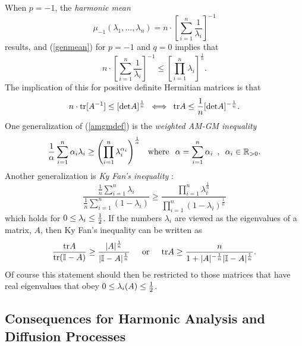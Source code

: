 \documentclass{svmult}
\def\half{ {1\over 2} }
\def\htab{ {\hskip 0.1 true in} }
\newcommand{\beq}{ \begin{equation}}
\newcommand{\eeq}{ \end{equation} }
\newcommand{\IR}{\mathbb{R}}
\newcommand{\II}{\mathbb{I}}
\newcommand{\wskip}{\htab {\rm where} \htab}
\begin{document}
When $p=-1$, the {\it harmonic mean}
$$ \mu_{-1}(\lambda_1,...,\lambda_n) = n \cdot \left[\sum_{i=1}^{n} \frac{1}{\lambda_i} \right]^{-1} $$
results, and (\ref{genmean}) for $p=-1$ and $q=0$ implies that
$$  n \cdot \left[\sum_{i=1}^{n} \frac{1}{\lambda_i} \right]^{-1} \leq \left[\prod_{i=1}^{n} {\lambda_i} \right]^{\frac{1}{n}}. $$
The implication of this for positive definite Hermitian matrices is that
\beq
n \cdot {\rm tr} [A^{-1}] \leq [{\rm det} A]^{\frac{1}{n}} \,\,\, \Longleftrightarrow \,\,\, {\rm tr} A \leq \frac{1}{n} [{\rm det} A]^{-\frac{1}{n}}.
\label{dkkk332d}
\eeq
One generalization of (\ref{amgmdef}) is the {\it weighted AM-GM inequality}
\beq
\frac{1}{\alpha} \sum_{i=1}^{n} \alpha_i \lambda_i \geq \left(\prod_{i=1}^{n} \lambda_i^{\alpha_i}
\right)^{\frac{1}{\alpha}} \wskip \alpha = \sum_{i=1}^{n} \alpha_i \,\,\, , \,\,\, \alpha_i \in \IR_{>0}.
\label{weightedamgmdef}
\eeq
Another generalization is {\it Ky Fan's inequality} \cite{Neuman}:
\beq
\frac{\frac{1}{n} \sum_{i=1}^{n} \lambda_i}{\frac{1}{n} \sum_{i=1}^{n} (1-\lambda_i)}
 \geq \frac{\prod_{i=1}^{n} \lambda_i^{\frac{1}{n}}}{\prod_{i=1}^{n} (1-\lambda_i)^{\frac{1}{n}}}
\label{kyfanlambda}
\eeq
which holds for $0 \leq \lambda_i \leq \half$.
If the numbers $\lambda_i$ are viewed as the eigenvalues of a matrix, $A$,
then Ky Fan's inequality can be written as
\beq
\frac{{\rm tr} A}{{\rm tr} (\II - A)}
\geq \frac{|A|^{\frac{1}{n}}}{|\II - A|^{\frac{1}{n}}}
\hskip 0.2 true in {\rm or} \hskip 0.2 true in
{\rm tr} A \geq \frac{n}{1 + |A|^{-\frac{1}{n}} |\II - A|^{\frac{1}{n}}}.
\label{kyfanlambdamat}
\eeq
Of course this statement should then be restricted to those matrices that have real eigenvalues that obey
$0 \leq \lambda_i(A) \leq \half$.

\subsection{Consequences for Harmonic Analysis and Diffusion Processes}
\end{document}
